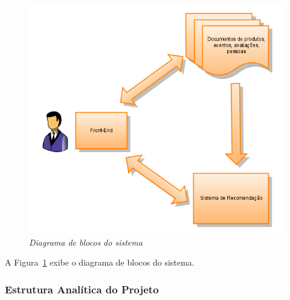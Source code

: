 \begin{figure}
  \centering
  \includegraphics[width=\textwidth]{imagens/escopo}
  \caption{\it Diagrama de blocos do sistema}
  \label{fig:escopo}
\end{figure}

A Figura~\ref{fig:escopo} exibe o diagrama de blocos do sistema.

\subsubsection{Estrutura Analítica do Projeto} %
\label{ssub:estrutura_analítca_do_projeto}

